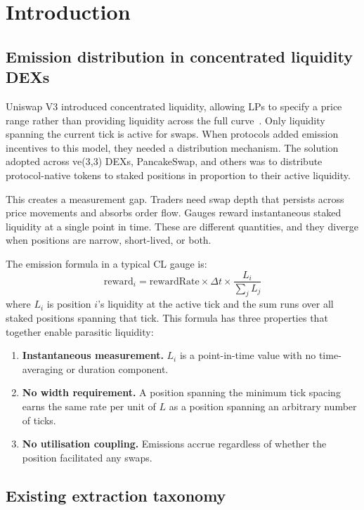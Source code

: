 \documentclass[11pt,a4paper]{article}
\theoremstyle{definition}
\begin{document}
\section{Introduction}\label{sec:intro}

\subsection{Emission distribution in concentrated liquidity DEXs}\label{sec:emission}

Uniswap V3 introduced concentrated liquidity, allowing LPs to specify a price range rather than providing liquidity across the full curve~\cite{adams2021}. Only liquidity spanning the current tick is active for swaps. When protocols added emission incentives to this model, they needed a distribution mechanism. The solution adopted across ve(3,3) DEXs, PancakeSwap, and others was to distribute protocol-native tokens to staked positions in proportion to their active liquidity.

This creates a measurement gap. Traders need swap depth that persists across price movements and absorbs order flow. Gauges reward instantaneous staked liquidity at a single point in time. These are different quantities, and they diverge when positions are narrow, short-lived, or both.

The emission formula in a typical CL gauge is:
\begin{equation}
\text{reward}_i = \text{rewardRate} \times \Delta t \times \frac{L_i}{\sum_j L_j}
\end{equation}
where $L_i$ is position $i$'s liquidity at the active tick and the sum runs over all staked positions spanning that tick. This formula has three properties that together enable parasitic liquidity:

\begin{enumerate}[leftmargin=2em]
\item \textbf{Instantaneous measurement.} $L_i$ is a point-in-time value with no time-averaging or duration component.
\item \textbf{No width requirement.} A position spanning the minimum tick spacing earns the same rate per unit of $L$ as a position spanning an arbitrary number of ticks.
\item \textbf{No utilisation coupling.} Emissions accrue regardless of whether the position facilitated any swaps.
\end{enumerate}

\subsection{Existing extraction taxonomy}\label{sec:taxonomy}
\end{document}
